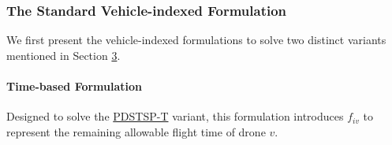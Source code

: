 \documentclass[3p, authoryear, 11pt]{elsarticle}
\begin{document}
\subsubsection{The Standard Vehicle-indexed Formulation}
\label{sec:cp_base_model}

We first present the vehicle-indexed formulations to solve two distinct variants mentioned in Section \hyperref[sec:problem_description]{3}.


\paragraph{Time-based Formulation} 
Designed to solve the \hyperref[sec:time_model_des]{PDSTSP-T} variant, this formulation introduces $f_{iv}$ to represent the remaining allowable flight time of drone $v$. 
\end{document}
